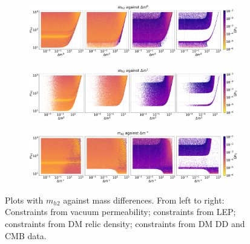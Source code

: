 \documentclass[12pt]{article}
\begin{document}
\begin{figure}[H]
    \begin{subfigure}[b]{\columnwidth}
      \centering
      \includegraphics[width=1\columnwidth]{4plot/MD2_DM2.pdf}
    \end{subfigure}
    
    \begin{subfigure}[b]{\columnwidth}
      \centering
      \includegraphics[width=1\columnwidth]{4plot/MD2_DM3.pdf}
    \end{subfigure}

    \begin{subfigure}[b]{\columnwidth}
      \centering
      \includegraphics[width=1\columnwidth]{4plot/MD2_DMP.pdf}
    \end{subfigure}
    \caption{Plots with $m_{h2}$ against mass differences. From left to right: Constraints from vacuum permeability; constraints from LEP; constraints from DM relic density; constraints from DM DD and CMB data.}
\end{figure}
\end{document}
